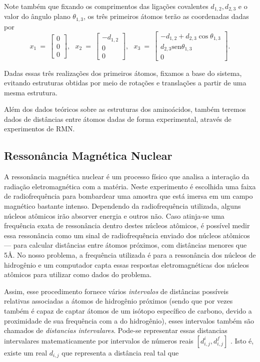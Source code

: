\documentclass[a4paper,12pt]{article}
\begin{document}
	Note também que fixando os comprimentos das ligações covalentes $d_{1,2},d_{2,3}$ e o valor do ângulo plano $\theta_{1,3}$, os três primeiros átomos terão as coordenadas dadas por
	$$
	x_1\:=\:
	\begin{bmatrix}
	0\\ 
	0\\  
	0
	\end{bmatrix},\:\:\:
	x_2\:=\:
	\begin{bmatrix}
	-d_{1,2}\\ 
	0\\  
	0
	\end{bmatrix},\:\:\:
	x_3\:=\:
	\begin{bmatrix}
	-d_{1,2}+d_{2,3}\cos\theta_{1,3}\\ 
	d_{2,3}\mbox{sen}\theta_{1,3}\\  
	0
	\end{bmatrix}.
	$$
	
	Dadas essas três realizações dos primeiros átomos, fixamos a base do sistema, evitando estruturas obtidas por meio de rotações e translações a partir de uma mesma estrutura.	
	
	Além dos dados teóricos sobre as estruturas dos aminoácidos, também teremos dados de distâncias entre átomos dadas de forma experimental, através de experimentos de RMN.
	
	\subsection{Ressonância Magnética Nuclear}
	A ressonância magnética nuclear é um processo físico que analisa a interação da radiação eletromagnética com a matéria. Neste experimento é escolhida uma faixa de radiofrequência para bombardear uma amostra que está imersa em um campo magnético bastante intenso. Dependendo da radiofrequência utilizada, alguns núcleos atômicos irão absorver energia e outros não. Caso atinja-se uma frequência exata de ressonância dentro destes núcleos atômicos, é possível medir essa ressonância como um sinal de radiofrequência enviado dos núcleos atômicos --- para calcular distâncias entre átomos próximos, com distâncias menores que 5\AA. No nosso problema, a frequência utilizada é para a ressonância dos núcleos de hidrogênio e um computador capta essas respostas eletromagnéticas dos núcleos atômicos para utilizar como dados do problema. \cite{RMNBookIntroduction}
	
	Assim, esse procedimento fornece vários \textit{intervalos} de distâncias possíveis relativas associadas a átomos de hidrogênio próximos (sendo que por vezes também 
	é capaz de captar átomos de um isótopo específico de carbono, devido a proximidade de sua frequência com a do hidrogênio), esses intervalos também são chamados de \textit{distancias intervalares}. Pode-se representar essas distancias intervalares matematicamente por intervalos de números reais $[d_{i,j}^i, d_{i,j}^f]$ . Isto é, existe um real $d_{i,j}$ que representa a distância real tal que
	
\end{document}
